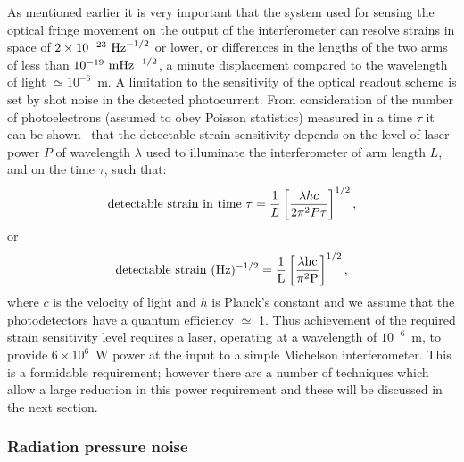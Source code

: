 \documentclass{article}
\begin{document}
As mentioned earlier it is very important that the system used for sensing the
optical fringe movement on the output of the interferometer can resolve strains
in space of $2 \times 10^{-23}~{\rm Hz}^{-1/2}$ or lower, or differences in the
lengths of the two arms of less than $10^{-19}~{\rm m}{\rm Hz}^{-1/2}$, a
minute displacement compared to the wavelength of light $\simeq 10^{-6}$~m. A
limitation to the sensitivity of the optical readout scheme is set by shot noise
in the detected photocurrent. From consideration of the number of photoelectrons
(assumed to obey Poisson statistics) measured in a time $\tau$ it can be
shown~\cite{HoughMG5} that the detectable strain sensitivity depends on the
level of laser power $P$ of wavelength $\lambda$ used to illuminate the
interferometer of arm length $L$, and on the time $\tau$, such that:
%
\begin{equation}
  {\rm detectable\ strain\ in\ time\ } \tau = \frac 1{L}\left[\frac{\lambda h
  c}{2 \pi^{2} P \tau}\right]^{1/2},
  \label{equation:shot1}
\end{equation}
%
or
%
\begin{equation}
  {\rm detectable\ strain\ }(\rm Hz)^{-1/2} = \frac
  1{L}\left[\frac{\lambda h c}{\pi^{2} P }\right]^{1/2},
  \label{equation:shot2}
\end{equation}
%
where $c$ is the velocity of light and $h$ is Planck's constant and we assume
that the photodetectors have a quantum efficiency $\simeq$ 1. Thus achievement
of the required strain sensitivity level requires a laser, operating at a
wavelength of $10^{-6}$~m, to provide $6 \times 10^{6}$~W power at the input to
a simple Michelson interferometer. This is a formidable requirement; however
there are a number of techniques which allow a large reduction in this power
requirement and these will be discussed in the next section.


\subsubsection{Radiation pressure noise}
\label{subsubsection:radiationnoise}
\end{document}
